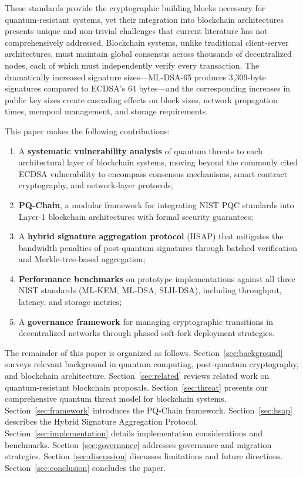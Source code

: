 \documentclass[12pt, a4paper, twocolumn]{article}
\begin{document}
These standards provide the cryptographic building blocks necessary for quantum-resistant systems, yet their integration into blockchain architectures presents unique and non-trivial challenges that current literature has not comprehensively addressed. Blockchain systems, unlike traditional client-server architectures, must maintain global consensus across thousands of decentralized nodes, each of which must independently verify every transaction. The dramatically increased signature sizes---ML-DSA-65 produces 3,309-byte signatures compared to ECDSA's 64 bytes---and the corresponding increases in public key sizes create cascading effects on block sizes, network propagation times, mempool management, and storage requirements.

This paper makes the following contributions:

\begin{enumerate}[noitemsep]
  \item A \textbf{systematic vulnerability analysis} of quantum threats to each architectural layer of blockchain systems, moving beyond the commonly cited ECDSA vulnerability to encompass consensus mechanisms, smart contract cryptography, and network-layer protocols;
  \item \textbf{PQ-Chain}, a modular framework for integrating NIST PQC standards into Layer-1 blockchain architectures with formal security guarantees;
  \item A \textbf{hybrid signature aggregation protocol} (HSAP) that mitigates the bandwidth penalties of post-quantum signatures through batched verification and Merkle-tree-based aggregation;
  \item \textbf{Performance benchmarks} on prototype implementations against all three NIST standards (ML-KEM, ML-DSA, SLH-DSA), including throughput, latency, and storage metrics;
  \item A \textbf{governance framework} for managing cryptographic transitions in decentralized networks through phased soft-fork deployment strategies.
\end{enumerate}

The remainder of this paper is organized as follows. Section~\ref{sec:background} surveys relevant background in quantum computing, post-quantum cryptography, and blockchain architecture. Section~\ref{sec:related} reviews related work on quantum-resistant blockchain proposals. Section~\ref{sec:threat} presents our comprehensive quantum threat model for blockchain systems. Section~\ref{sec:framework} introduces the PQ-Chain framework. Section~\ref{sec:hsap} describes the Hybrid Signature Aggregation Protocol. Section~\ref{sec:implementation} details implementation considerations and benchmarks. Section~\ref{sec:governance} addresses governance and migration strategies. Section~\ref{sec:discussion} discusses limitations and future directions. Section~\ref{sec:conclusion} concludes the paper.
\end{document}
